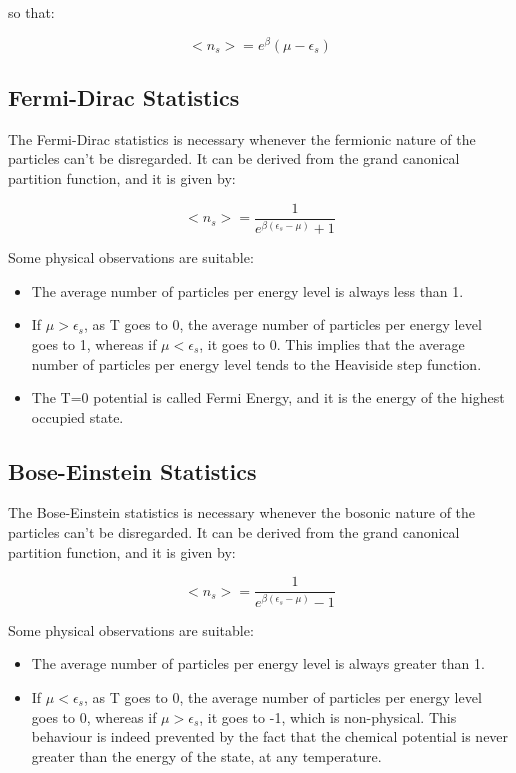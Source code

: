 \documentclass{article}
\begin{document}
so that:

\begin{equation}
    <n_s>=e^\beta(\mu-\epsilon_s)
\end{equation}


\subsection{Fermi-Dirac Statistics}

The Fermi-Dirac statistics is necessary whenever the fermionic nature of the particles
can't be disregarded.
It can be derived from the grand canonical partition function, and it is given by:

\begin{equation}
    <n_s>=\frac{1}{e^{\beta(\epsilon_s-\mu)}+1}
\end{equation}

Some physical observations are suitable:

\begin{itemize}
    \item The average number of particles per energy level is always less than 1.
    \item If $\mu>\epsilon_s$, as T goes to 0, the average number of particles per energy level goes to 1,
          whereas if $\mu<\epsilon_s$, it goes to 0. This implies that the average number of particles per energy level tends to
          the Heaviside step function.
    \item The T=0 potential is called Fermi Energy, and it is the energy of the highest occupied state.
\end{itemize}

\subsection{Bose-Einstein Statistics}

The Bose-Einstein statistics is necessary whenever the bosonic nature of the particles
can't be disregarded.
It can be derived from the grand canonical partition function, and it is given by:

\begin{equation}
    <n_s>=\frac{1}{e^{\beta(\epsilon_s-\mu)}-1}
\end{equation}

Some physical observations are suitable:

\begin{itemize}
    \item The average number of particles per energy level is always greater than 1.
    \item If $\mu<\epsilon_s$, as T goes to 0, the average number of particles per energy level goes to 0,
          whereas if $\mu>\epsilon_s$, it goes to -1, which is non-physical. This behaviour is indeed prevented by
          the fact that the chemical potential is never greater than the energy of the state, at any temperature.
\end{itemize}
\end{document}
